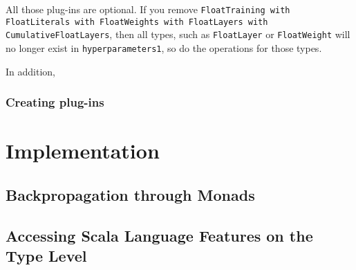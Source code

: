 All those \glspl{plug-in} are optional. If you remove \lstinline{FloatTraining with FloatLiterals with FloatWeights with FloatLayers with CumulativeFloatLayers}, then all types, such as  \lstinline{FloatLayer} or \lstinline{FloatWeight} will no longer exist in \lstinline{hyperparameters1}, so do the operations for those types.

In addition, 

\subsubsection{Creating \Glspl{plug-in}}


\section{Implementation}
\subsection{Backpropagation through Monads\label{backpropagation}}
\subsection{Accessing Scala Language Features on the Type Level\label{typelevel}}

\clearpage
\appendix

\printglossary

\begin{acks}
\end{acks}


